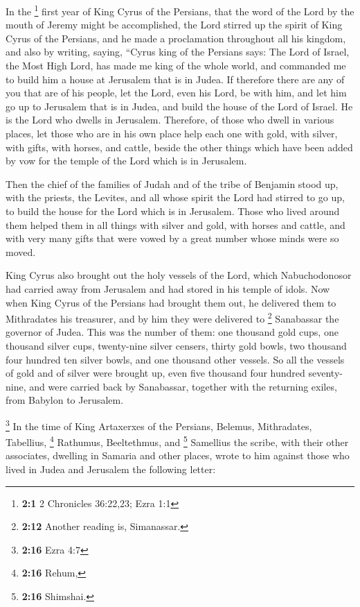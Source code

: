 In the \footnote{\textbf{2:1} 2 Chronicles 36:22,23; Ezra
  1:1} first year of King Cyrus of the Persians, that the word of the
Lord by the mouth of Jeremy might be accomplished,  the
Lord stirred up the spirit of King Cyrus of the Persians, and he made a
proclamation throughout all his kingdom, and also by writing,
 saying, ``Cyrus king of the Persians says: The Lord of
Israel, the Most High Lord, has made me king of the whole world,
 and commanded me to build him a house at Jerusalem that
is in Judea.  If therefore there are any of you that are
of his people, let the Lord, even his Lord, be with him, and let him go
up to Jerusalem that is in Judea, and build the house of the Lord of
Israel. He is the Lord who dwells in Jerusalem. 
Therefore, of those who dwell in various places, let those who are in
his own place help each one with gold, with silver,  with
gifts, with horses, and cattle, beside the other things which have been
added by vow for the temple of the Lord which is in Jerusalem.

 Then the chief of the families of Judah and of the tribe
of Benjamin stood up, with the priests, the Levites, and all whose
spirit the Lord had stirred to go up, to build the house for the Lord
which is in Jerusalem.  Those who lived around them helped
them in all things with silver and gold, with horses and cattle, and
with very many gifts that were vowed by a great number whose minds were
so moved.

 King Cyrus also brought out the holy vessels of the
Lord, which Nabuchodonosor had carried away from Jerusalem and had
stored in his temple of idols.  Now when King Cyrus of
the Persians had brought them out, he delivered them to Mithradates his
treasurer,  and by him they were delivered to \footnote{\textbf{2:12}
  Another reading is, Simanassar.} Sanabassar the governor of Judea.
 This was the number of them: one thousand gold cups, one
thousand silver cups, twenty-nine silver censers, thirty gold bowls, two
thousand four hundred ten silver bowls, and one thousand other vessels.
 So all the vessels of gold and of silver were brought
up, even five thousand four hundred seventy-nine,  and
were carried back by Sanabassar, together with the returning exiles,
from Babylon to Jerusalem.

 \footnote{\textbf{2:16} Ezra 4:7} In the time of King
Artaxerxes of the Persians, Belemus, Mithradates, Tabellius, \footnote{\textbf{2:16}
  Rehum,} Rathumus, Beeltethmus, and \footnote{\textbf{2:16} Shimshai.}
Samellius the scribe, with their other associates, dwelling in Samaria
and other places, wrote to him against those who lived in Judea and
Jerusalem the following letter:

